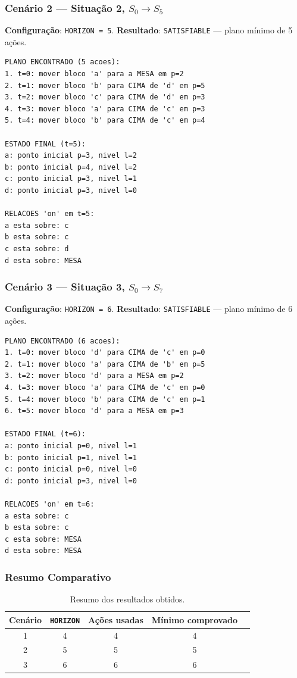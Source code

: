 \documentclass[12pt,a4paper]{article}
\begin{document}
\subsubsection{Cenário 2 — Situação 2, $S_0 \to S_5$}

\textbf{Configuração}: \texttt{HORIZON = 5}. \textbf{Resultado}: \texttt{SATISFIABLE} — plano mínimo de 5 ações.

\begin{lstlisting}
PLANO ENCONTRADO (5 acoes):
1. t=0: mover bloco 'a' para a MESA em p=2
2. t=1: mover bloco 'b' para CIMA de 'd' em p=5
3. t=2: mover bloco 'c' para CIMA de 'd' em p=3
4. t=3: mover bloco 'a' para CIMA de 'c' em p=3
5. t=4: mover bloco 'b' para CIMA de 'c' em p=4

ESTADO FINAL (t=5):
a: ponto inicial p=3, nivel l=2
b: ponto inicial p=4, nivel l=2
c: ponto inicial p=3, nivel l=1
d: ponto inicial p=3, nivel l=0

RELACOES 'on' em t=5:
a esta sobre: c
b esta sobre: c
c esta sobre: d
d esta sobre: MESA
\end{lstlisting}

\subsubsection{Cenário 3 — Situação 3, $S_0 \to S_7$}

\textbf{Configuração}: \texttt{HORIZON = 6}. \textbf{Resultado}: \texttt{SATISFIABLE} — plano mínimo de 6 ações.

\begin{lstlisting}
PLANO ENCONTRADO (6 acoes):
1. t=0: mover bloco 'd' para CIMA de 'c' em p=0
2. t=1: mover bloco 'a' para CIMA de 'b' em p=5
3. t=2: mover bloco 'd' para a MESA em p=2
4. t=3: mover bloco 'a' para CIMA de 'c' em p=0
5. t=4: mover bloco 'b' para CIMA de 'c' em p=1
6. t=5: mover bloco 'd' para a MESA em p=3

ESTADO FINAL (t=6):
a: ponto inicial p=0, nivel l=1
b: ponto inicial p=1, nivel l=1
c: ponto inicial p=0, nivel l=0
d: ponto inicial p=3, nivel l=0

RELACOES 'on' em t=6:
a esta sobre: c
b esta sobre: c
c esta sobre: MESA
d esta sobre: MESA
\end{lstlisting}

\subsubsection{Resumo Comparativo}

\begin{table}[h!]
\centering
\begin{tabular}{@{}ccccc@{}}
\toprule
\textbf{Cenário} & \texttt{HORIZON} & \textbf{Ações usadas} & \textbf{Mínimo comprovado} \\
\midrule
1 & 4 & 4 & 4 \\
2 & 5 & 5 & 5 \\
3 & 6 & 6 & 6 \\
\bottomrule
\end{tabular}
\caption{Resumo dos resultados obtidos.}
\end{table}
\end{document}
